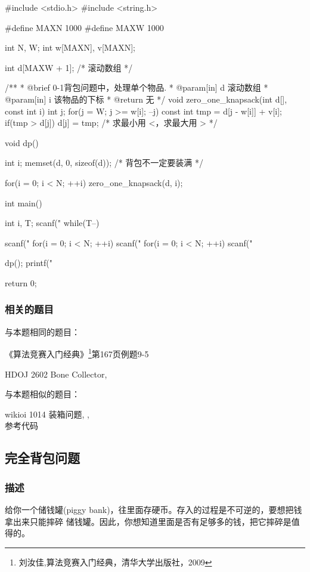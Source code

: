 \begin{Codex}[label=01knapsack2.c]
#include <stdio.h>
#include <string.h>

#define MAXN 1000
#define MAXW 1000

int N, W;
int w[MAXN], v[MAXN];

int d[MAXW + 1]; /* 滚动数组 */

/**
 * @brief 0-1背包问题中，处理单个物品.
 * @param[in] d 滚动数组
 * @param[in] i 该物品的下标
 * @return 无
 */
void zero_one_knapsack(int d[], const int i) {
    int j;
    for(j = W; j >= w[i]; --j) {
        const int tmp = d[j - w[i]] + v[i];
        if(tmp > d[j]) d[j] = tmp; /* 求最小用 <，求最大用 > */
    }
}

void dp() {
    int i;
    memset(d, 0, sizeof(d)); /* 背包不一定要装满 */

    for(i = 0; i < N; ++i) zero_one_knapsack(d, i);
}

int main() {
    int i, T;
    scanf("%
    while(T--) {
        scanf("%
        for(i = 0; i < N; ++i) scanf("%
        for(i = 0; i < N; ++i) scanf("%

        dp();
        printf("%
    }
    return 0;
}
\end{Codex}

\subsubsection{相关的题目}
与本题相同的题目：
\begindot
\item 《算法竞赛入门经典》\footnote{刘汝佳,算法竞赛入门经典，清华大学出版社，2009}第167页例题9-5
\item  HDOJ 2602 Bone Collector, 
\myenddot

与本题相似的题目：
\begindot
\item  wikioi 1014 装箱问题, , \\
参考代码 
\myenddot

\subsection{完全背包问题}
\label{sec:ukp}

\subsubsection{描述}
给你一个储钱罐(piggy bank)，往里面存硬币。存入的过程是不可逆的，要想把钱拿出来只能摔碎
储钱罐。因此，你想知道里面是否有足够多的钱，把它摔碎是值得的。

